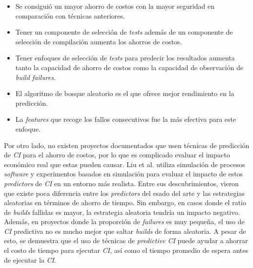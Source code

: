 \begin{itemize}
      \item Se consiguió un mayor ahorro de costos con la mayor seguridad en comparación con
      técnicas anteriores.
      \item Tener un componente de selección de \textit{tests} además de un componente de
      selección de compilación aumenta los ahorros de costos.
      \item Tener enfoques de selección de \textit{tests} para predecir los resultados aumenta
      tanto la capacidad de ahorro de costos como la capacidad de observación de \textit{build
      failures}.
      \item El algoritmo de bosque aleatorio es el que ofrece mejor rendimiento en la predicción.
      \item La \textit{features} que recoge los fallos consecutivos fue la más efectiva para este
      enfoque.
\end{itemize}

Por otro lado, no existen proyectos documentados que usen técnicas de predicción de \textit{CI}
para el ahorro de costos, por lo que es complicado evaluar el impacto económico real que estas
pueden causar. Liu et al. \cite{19} utiliza simulación de procesos \textit{software} y
experimentos basados en simulación para evaluar el impacto de estos \textit{predictors} de
\textit{CI} en un entorno más realista. Entre sus descubrimientos, vieron que existe poca
diferencia entre los \textit{predictors} del esado del arte y las estrategias aleatorias en
términos de ahorro de tiempo. Sin embargo, en casos donde el ratio de \textit{builds} fallidas
es mayor, la estrategia aleatoria tendría un impacto negativo. Además, en proyectos donde la
proporción de \textit{failures} es muy pequeña, el uso de \textit{CI} predictiva no es mucho
mejor que saltar \textit{builds} de forma aleatoria. A pesar de esto, se demuestra que el uso
de técnicas de \textit{predictive CI} puede ayudar a ahorrar el costo de tiempo para ejecutar
\textit{CI}, así como el tiempo promedio de espera antes de ejecutar la \textit{CI}.
